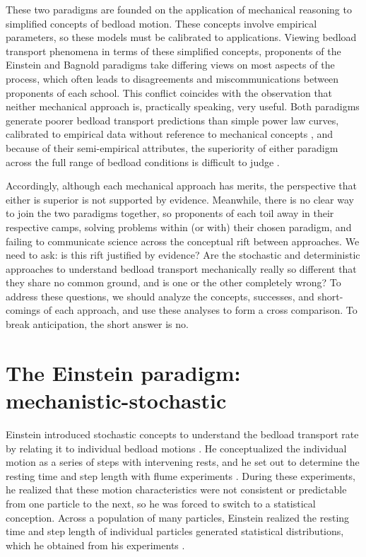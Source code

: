 \documentclass{article}
\begin{document}
These two paradigms are founded on the application of mechanical reasoning to simplified concepts of bedload motion.
These concepts involve empirical parameters, so these models must be calibrated to applications. 
Viewing bedload transport phenomena in terms of these simplified concepts, proponents of the Einstein and Bagnold paradigms take differing views on most aspects of the process, which often leads to disagreements and miscommunications between proponents of each school. 
This conflict coincides with the observation that neither mechanical approach is, practically speaking, very useful.
Both paradigms generate poorer bedload transport predictions than simple power law curves, calibrated to empirical data without reference to mechanical concepts \citep{Barry2004}, and because of their semi-empirical attributes, the superiority of either paradigm across the full range of bedload conditions is difficult to judge \citep{Iverson2013}. 

Accordingly, although each mechanical approach has merits, the perspective that either is superior is not supported by evidence. 
Meanwhile, there is no clear way to join the two paradigms together, so proponents of each toil away in their respective camps, solving problems within (or with) their chosen paradigm, and failing to communicate science across the conceptual rift between approaches. 
We need to ask: is this rift justified by evidence? 
Are the stochastic and deterministic approaches to understand bedload transport mechanically really so different that they share no common ground, and is one or the other completely wrong? 
To address these questions, we should analyze the concepts, successes, and short-comings of each approach, and use these analyses to form a cross comparison.  
To break anticipation, the short answer is no.  


\section{The Einstein paradigm: mechanistic-stochastic}


Einstein introduced stochastic concepts to understand the bedload transport rate by relating it to individual bedload motions \citep{Einstein1942, Einstein1950}.
He conceptualized the individual motion as a series of steps with intervening rests, and he set out to determine the resting time and step length with flume experiments \citep{Einstein1937}. 
During these experiments, he realized that these motion characteristics were not consistent or predictable from one particle to the next, so he was forced to switch to a statistical conception.
Across a population of many particles, Einstein realized the resting time and step length of individual particles generated statistical distributions, which he obtained from his experiments \citep{Einstein1937}. 
\end{document}
